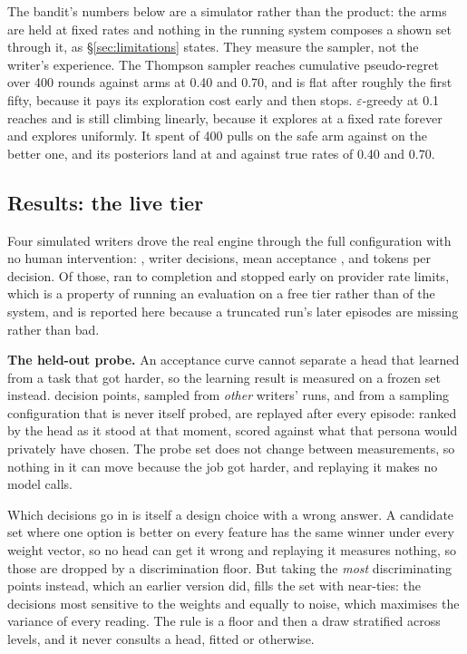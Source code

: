 \documentclass{article}
\begin{document}
The bandit's numbers below are a simulator rather than the product: the arms are held at
fixed rates and nothing in the running system composes a shown set through it, as
\S\ref{sec:limitations} states. They measure the sampler, not the writer's experience.
The Thompson sampler reaches cumulative pseudo-regret \rBanditThompsonRegret{} over 400
rounds against arms at 0.40 and 0.70, and is flat after roughly the first fifty, because it
pays its exploration cost early and then stops. $\varepsilon$-greedy at 0.1 reaches
\rBanditEpsilonRegret{} and is still climbing linearly, because it explores at a fixed rate
forever and explores uniformly. It spent \rBanditPullsSafe{} of 400 pulls on the safe arm
against \rBanditPullsExplore{} on the better one, and its posteriors land at
\rBanditPosteriorSafe{} and \rBanditPosteriorExplore{} against true rates of 0.40 and 0.70.


\subsection{Results: the live tier}

Four simulated writers drove the real engine through the full configuration with no human
intervention: \rLiveRunCount{} \rLiveRunPlural, \rLiveDecisionsTotal{} writer decisions,
mean acceptance \rLiveAcceptanceMean{}, and \rLiveTokensPerAction{} tokens per decision.
Of those, \rLiveRunsCompleted{} ran to completion and \rLiveRunsTruncated{} stopped early
on provider rate limits, which is a property of running an evaluation on a free tier rather
than of the system, and is reported here because a truncated run's later episodes are
missing rather than bad.

\textbf{The held-out probe.} An acceptance curve cannot separate a head that learned from a
task that got harder, so the learning result is measured on a frozen set instead.
\rProbePoints{} decision points, sampled from \emph{other} writers' runs, and from a
sampling configuration that is never itself probed, are replayed after every episode:
ranked by the head as it stood at that moment, scored against what that persona would
privately have chosen. The probe set does not change between measurements, so nothing in it
can move because the job got harder, and replaying it makes no model calls.

Which decisions go in is itself a design choice with a wrong answer. A candidate set where
one option is better on every feature has the same winner under every weight vector, so no
head can get it wrong and replaying it measures nothing, so those are dropped by a
discrimination floor. But taking the \emph{most} discriminating points instead, which an
earlier version did, fills the set with near-ties: the decisions most sensitive to the
weights and equally to noise, which maximises the variance of every reading. The rule is a
floor and then a draw stratified across levels, and it never consults a head, fitted or
otherwise.
\end{document}
